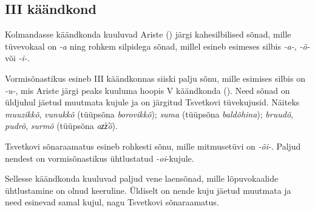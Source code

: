 \documentclass[12pt,a4paper]{article}
\newcommand{\vadja}[1]{\textit{#1}}
\begin{document}
\subsection{\RN{3} käändkond}

Kolmandasse käändkonda kuuluvad Ariste (\citeyear[42]{ariste_grammar_1968}) järgi kahesilbilised sõnad, mille tüvevokaal on \vadja{-a} ning rohkem silpidega sõnad, millel esineb esimeses silbis \vadja{-a-}, \vadja{-õ-} või \vadja{-i-}.

Vormisõnastikus esineb \RN{3} käändkonnas siiski palju sõnu, mille esimises silbis on \textit{-u-}, mis Ariste järgi peaks kuuluma hoopis \RN{5} käändkonda (\cite[44]{ariste_grammar_1968}). Need sõnad on üldjuhul jäetud muutmata kujule ja on järgitud Tsvetkovi tüvekujusid. Näiteks \textit{muuzikkõ}, \textit{vunukkõ} (tüüp\-sõna \textit{borovikkõ}); \textit{suma} (tüüp\-sõna \textit{baldõhina}); \textit{bruudõ}, \textit{pudrõ}, \textit{surmõ} (tüüp\-sõna \textit{az̕z̕õ}).

Tsvetkovi sõnaraamatus esineb rohkesti sõnu, mille mitmuse\-tüvi on \textit{-õi-}. Paljud nendest on vormi\-sõnastikus ühtlustatud \textit{-oi}-kujule.

Sellesse käändkonda kuuluvad paljud vene laen\-sõnad, mille lõpu\-vokaalide ühtlustamine on olnud keeruline. Üldiselt on nende kuju jäetud muutmata ja need esinevad samal kujul, nagu Tsvetkovi sõnaraamatus.

\end{document}
